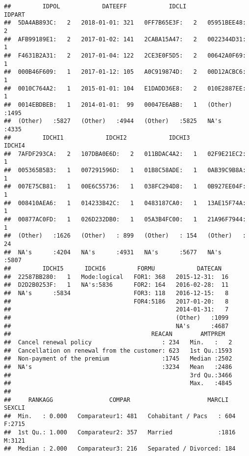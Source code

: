 \documentclass[
]{article}
\begin{document}
\begin{verbatim}
##         IDPOL            DATEEFF            IDCLI             IDPART    
##  5DA4AB893C:   2   2018-01-01: 321   0FF7B65E3F:   2   05951BEE48:   2  
##  AFB99189E1:   2   2017-01-02: 141   2CABA15A47:   2   0022344D31:   1  
##  F4631B2A31:   2   2017-01-04: 122   2CE3E0F5D5:   2   00642A0F69:   1  
##  000B46F609:   1   2017-01-12: 105   A0C919874D:   2   00D12ACBC6:   1  
##  0010C764A2:   1   2015-01-01: 104   E1DADD36E8:   2   010E2887EE:   1  
##  0014EBDBEB:   1   2014-01-01:  99   00047E6ABB:   1   (Other)   :1495  
##  (Other)   :5827   (Other)   :4944   (Other)   :5825   NA's      :4335  
##         IDCHI1            IDCHI2            IDCHI3            IDCHI4    
##  7AFDF293CA:   2   107DBA0E6D:   2   011BDAC4A2:   1   02F9E21EC2:   1  
##  005365B5B3:   1   007291596D:   1   01B8C58ADE:   1   0AB39C9B8A:   1  
##  007E75CB81:   1   00E6C55736:   1   038FC294D8:   1   0B927EE04F:   1  
##  008410AEA6:   1   014233B42C:   1   0483187CA0:   1   13AE15F74A:   1  
##  00877AC0FD:   1   026D232DB0:   1   05A3B4FC00:   1   21A96F7944:   1  
##  (Other)   :1626   (Other)   : 899   (Other)   : 154   (Other)   :  24  
##  NA's      :4204   NA's      :4931   NA's      :5677   NA's      :5807  
##         IDCHI5      IDCHI6         FORMU            DATECAN    
##  22587BB280:   1   Mode:logical   FOR1: 368   2015-12-31:  16  
##  D2D2B0253F:   1   NA's:5836      FOR2: 164   2016-02-28:  11  
##  NA's      :5834                  FOR3: 118   2016-12-15:   8  
##                                   FOR4:5186   2017-01-20:   8  
##                                               2014-01-31:   7  
##                                               (Other)   :1099  
##                                               NA's      :4687  
##                                        REACAN        AMTPREM    
##  Cancel renewal policy                    : 234   Min.   :   2  
##  Cancellation on renewal from the customer: 623   1st Qu.:1593  
##  Non-payment of the premium               :1745   Median :2502  
##  NA's                                     :3234   Mean   :2486  
##                                                   3rd Qu.:3466  
##                                                   Max.   :4845  
##                                                                 
##     RANKAGG                COMPAR                      MARCLI     SEXCLI  
##  Min.   : 0.000   Comparateur1: 481   Cohabitant / Pacs   : 604   F:2715  
##  1st Qu.: 1.000   Comparateur2: 357   Married             :1816   M:3121  
##  Median : 2.000   Comparateur3: 216   Separated / Divorced: 184           

\end{verbatim}
\end{document}
